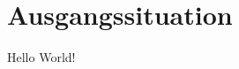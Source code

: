 \documentclass[../main.tex]{subfiles}
\begin{document}
    \section{Ausgangssituation}
    Hello World!
    \newpage
\end{document}
